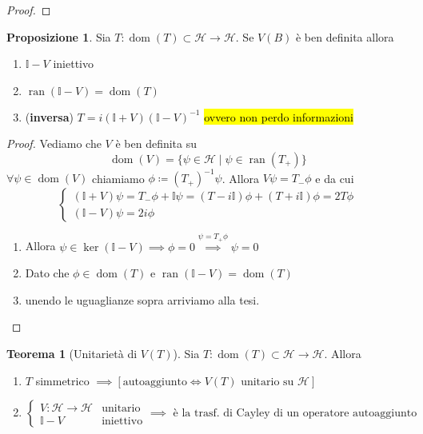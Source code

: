 \documentclass[a4paper,10pt]{article}
\theoremstyle{definition}
\DeclareMathOperator*{\ran}{ran}
\DeclareMathOperator*{\dom}{dom} %
\newcommand{\hil}{\mathcal{H}} %
\theoremstyle{indentdefinition}
\theoremstyle{indenttheorem}
\newtheorem{thm}{Teorema}
\newtheorem{prop}{Proposizione}
\theoremstyle{myremark}
\theoremstyle{indentgeneral}
\newenvironment{myboxed} 
{\noindent\begin{lrbox}{\mybox}\begin{minipage}{\textwidth}}
{\end{minipage}\end{lrbox}\fbox{\usebox{\mybox}}}
\begin{document}
\begin{proof}
    \todo{}
\end{proof}

\begin{myboxed}
    \begin{prop}
        Sia $T:\dom(T)\subset\hil\to \hil$. Se $V(B)$ è ben definita  allora
        \begin{enumerate}
            \item $\mathbb{I}-V$ iniettivo
            \item $\ran(\mathbb{I}-V)=\dom(T)$
            \item (\textbf{inversa}) $T=i(\mathbb{I}+V)(\mathbb{I}-V)^{-1}$ \hl{ovvero non perdo informazioni}
        \end{enumerate}
    \end{prop}
\end{myboxed}

\begin{proof}
Vediamo che $V$ è ben definita su 
$$\dom(V)=\{\psi\in\hil\mid\psi\in\ran(T_+)\}$$
$\forall\psi\in\dom(V)$ chiamiamo $\phi\coloneqq (T_+)^{-1}\psi$. Allora $V\psi=T_-\phi$ e  da cui
$$\begin{cases}
    (\mathbb{I}+V)\psi=T_-\phi+\mathbb{I}\psi=(T-i\mathbb{I})\phi+(T+i\mathbb{I})\phi=2T\phi\\
    (\mathbb{I}-V)\psi=2i\phi
\end{cases}$$
\begin{enumerate}
    \item Allora $\psi\in\ker(\mathbb{I}-V)\implies\phi=0\overset{\psi=T_+\phi}{\implies}\psi=0$
    \item Dato che $\phi\in\dom(T)$ e $\ran(\mathbb{I}-V)=\dom(T)$
    \item unendo le uguaglianze sopra arriviamo alla tesi.
\end{enumerate}
\end{proof}

\begin{myboxed}
    \begin{thm}[Unitarietà di $V(T)$]\label{thm-unitarietà-trasformata-cayley}
        Sia $T:\dom(T)\subset\hil\to \hil$. Allora
        \begin{enumerate}
            \item $T$ simmetrico $\implies[\text{autoaggiunto}\iff V(T) \text{ unitario su }\hil]$
            \item $\begin{cases}
                V:\hil\to\hil & \text{unitario}\\
                \mathbb{I}-V & \text{iniettivo}
            \end{cases}\implies \text{ è la trasf. di Cayley di un operatore autoaggiunto}$
        \end{enumerate}
    \end{thm}
\end{myboxed}
\end{document}
